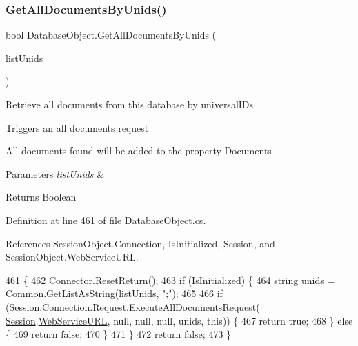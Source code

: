 \subsubsection{\texorpdfstring{Get\+All\+Documents\+By\+Unids()}{GetAllDocumentsByUnids()}\hspace{0.1cm}{\footnotesize\ttfamily [2/2]}}
{\footnotesize\ttfamily bool Database\+Object.\+Get\+All\+Documents\+By\+Unids (\begin{DoxyParamCaption}\item[{I\+List}]{list\+Unids }\end{DoxyParamCaption})}



Retrieve all documents from this database by universal\+I\+Ds 

Triggers an all documents request

All documents found will be added to the property \textquotesingle{}Documents\textquotesingle{}


\begin{DoxyParams}{Parameters}
{\em list\+Unids} & \\
\hline
\end{DoxyParams}
\begin{DoxyReturn}{Returns}
Boolean
\end{DoxyReturn}


Definition at line 461 of file Database\+Object.\+cs.



References Session\+Object.\+Connection, Is\+Initialized, Session, and Session\+Object.\+Web\+Service\+U\+RL.


\begin{DoxyCode}
461                                                         \{
462         \mbox{\hyperlink{class_connector}{Connector}}.ResetReturn();
463         \textcolor{keywordflow}{if} (\mbox{\hyperlink{class_database_object_a5fe036d32a30eb10d1b3f6a30263f740}{IsInitialized}}) \{
464             \textcolor{keywordtype}{string} unids = Common.GetListAsString(listUnids, \textcolor{stringliteral}{";"});
465 
466             \textcolor{keywordflow}{if} (\mbox{\hyperlink{class_database_object_aa8484162b7d2a7c4c9426bca13c64c07}{Session}}.\mbox{\hyperlink{class_session_object_a014bdbf705a753540e19bfb53030c55c}{Connection}}.Request.ExecuteAllDocumentsRequest(
      \mbox{\hyperlink{class_database_object_aa8484162b7d2a7c4c9426bca13c64c07}{Session}}.\mbox{\hyperlink{class_session_object_a697c071c812fbf7ad1166b896fb44c16}{WebServiceURL}}, null, null, null, unids, \textcolor{keyword}{this})) \{
467                 \textcolor{keywordflow}{return} \textcolor{keyword}{true};
468             \} \textcolor{keywordflow}{else} \{
469                 \textcolor{keywordflow}{return} \textcolor{keyword}{false};
470             \}
471         \}
472         \textcolor{keywordflow}{return} \textcolor{keyword}{false};
473     \}
\end{DoxyCode}
\mbox{\label{class_database_object_a9435cc20fe3a92747e509011b7726aff}} 

